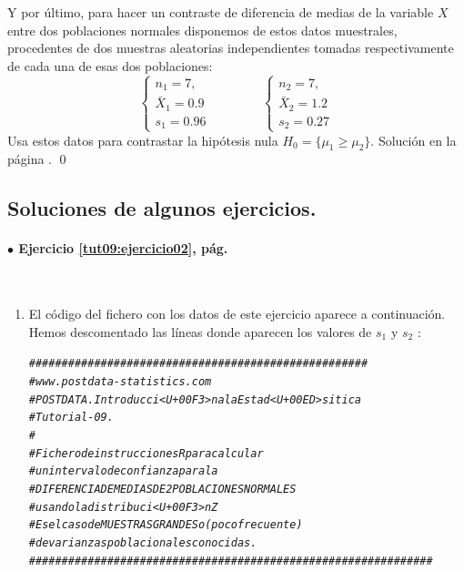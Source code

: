 \documentclass[10pt,a4paper]{article}\usepackage[]{graphicx}\usepackage[]{color}
\makeatletter
\newcommand{\hlcom}[1]{\textcolor[rgb]{0.678,0.584,0.686}{\textit{#1}}}%
\newenvironment{kframe}{%
 \def\at@end@of@kframe{}%
 \ifinner\ifhmode%
  \def\at@end@of@kframe{\end{minipage}}%
  \begin{minipage}{\columnwidth}%
 \fi\fi%
 \def\FrameCommand##1{\hskip\@totalleftmargin \hskip-\fboxsep
 \colorbox{shadecolor}{##1}\hskip-\fboxsep
     \hskip-\linewidth \hskip-\@totalleftmargin \hskip\columnwidth}%
 \MakeFramed {\advance\hsize-\width
   \@totalleftmargin\z@ \linewidth\hsize
   \@setminipage}}%
 {\par\unskip\endMakeFramed%
 \at@end@of@kframe}
\newenvironment{knitrout}{}{} %
\newcounter {cont01}
\makeatother
\begin{document}
{\begin{ejercicio}
\label{tut09:ejercicio09}




Y por último, para hacer un contraste de diferencia de medias de la variable $X$ entre dos poblaciones normales disponemos de estos datos muestrales, procedentes de dos muestras aleatorias independientes tomadas respectivamente de cada una de esas dos poblaciones:
\[
\begin{cases}
n_1 = 7,\\
{\bar X}_1 = 0.9\\
s_1 = 0.96
\end{cases}
\qquad\qquad
\begin{cases}
n_2 = 7,\\
{\bar X}_2 = 1.2\\
s_2 = 0.27
\end{cases}
\]
Usa estos datos para contrastar la hipótesis nula $H_0=\{\mu_1 \geq \mu_2 \}$.
Solución en la página \pageref{tut09:ejercicio09:sol}.
\qed
\end{ejercicio}



\subsection*{Soluciones de algunos ejercicios.}
\label{tut09:subsec:SolucionesAlgunosEjercicios}


\paragraph{\bf $\bullet$ Ejercicio \ref{tut09:ejercicio02}, pág. \pageref{tut09:ejercicio02}}
\label{tut09:ejercicio02:sol}\quad\\

\begin{enumerate}
  \item El código del fichero con los datos de este ejercicio aparece a continuación. Hemos descomentado las líneas donde aparecen los valores de $s_1$ y $s_2$ :

\begin{knitrout}
\color{fgcolor}\begin{kframe}
\begin{alltt}
    \hlcom{####################################################}
    \hlcom{# www.postdata-statistics.com}
    \hlcom{# POSTDATA. Introducci<U+00F3>n a la Estad<U+00ED>sitica}
    \hlcom{# Tutorial-09.}
    \hlcom{#}
    \hlcom{# Fichero de instrucciones R para calcular}
    \hlcom{# un intervalo de confianza para la}
    \hlcom{# DIFERENCIA DE MEDIAS DE 2 POBLACIONES NORMALES}
    \hlcom{# usando la distribuci<U+00F3>n Z}
    \hlcom{# Es el caso de MUESTRAS GRANDES o (poco frecuente)}
    \hlcom{# de varianzas poblacionales conocidas.}
    \hlcom{##############################################################}



\end{alltt}
\end{kframe}
\end{knitrout}
\end{enumerate}}
\end{document}
